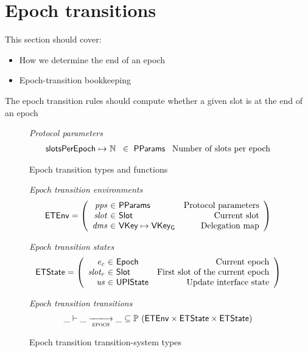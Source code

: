 \documentclass[11pt,a4paper]{article}
\newcommand{\powerset}[1]{\mathbb{P}~#1}
\newcommand{\var}[1]{\mathit{#1}}
\newcommand{\type}[1]{\mathsf{#1}}
\newcommand{\pp}[1]{\mathsf{#1}}
\newcommand{\trans}[2]{\xlongrightarrow[\textsc{#1}]{#2}}
\newcommand{\partialf}{\mapsto}
\newcommand{\Slot}{\type{Slot}}
\newcommand{\VKey}{\type{VKey}}
\newcommand{\VKeyGen}{\type{VKey_G}}
\newcommand{\ProtParams}{\type{PParams}} %
\begin{document}
\section{Epoch transitions}

\newcommand{\Epoch}{\type{Epoch}}

\newcommand{\ETState}{\type{ETState}}
\newcommand{\ETEnv}{\type{ETEnv}}

\newcommand{\UPIState}{\type{UPIState}}

This section should cover:
\begin{itemize}
\item How we determine the end of an epoch
\item Epoch-transition bookkeeping
\end{itemize}

The epoch transition rules should compute whether a given slot is at the end of
an epoch
\begin{figure}[ht]
  \emph{Protocol parameters}
  \begin{equation*}
    \begin{array}{r@{~\partialf~}l!{~\in~\ProtParams~}r}
    \pp{slotsPerEpoch} & \mathbb{N} & \text{Number of slots per epoch} \\
    \end{array}
  \end{equation*}
  \caption{Epoch transition types and functions}
  \label{fig:defs:epoch}
\end{figure}

\begin{figure}[ht]
  \emph{Epoch transition environments}
  \begin{equation*}
    \ETEnv =
    \left(
      \begin{array}{r@{~\in~}lr}
        \var{pps} & \ProtParams & \text{Protocol parameters} \\
        \var{slot} & \Slot & \text{Current slot} \\
        \var{dms} & \VKey \mapsto \VKeyGen & \text{Delegation map}
      \end{array}
    \right)
  \end{equation*}

  \emph{Epoch transition states}
  \begin{equation*}
    \ETState =
    \left(
      \begin{array}{r@{~\in~}lr}
        \var{e_c} & \Epoch & \text{Current epoch} \\
        \var{slot_r} & \Slot & \text{First slot of the current epoch} \\
        \var{us} & \UPIState & \text{Update interface state}
      \end{array}
    \right)
  \end{equation*}

  \emph{Epoch transition transitions}
  \begin{equation*}
    \_ \vdash \var{\_} \trans{epoch}{} \var{\_} \subseteq
    \powerset (\ETEnv \times \ETState \times \ETState)
  \end{equation*}
  \caption{Epoch transition transition-system types}
  \label{fig:ts-types:epoch}
\end{figure}
\end{document}
